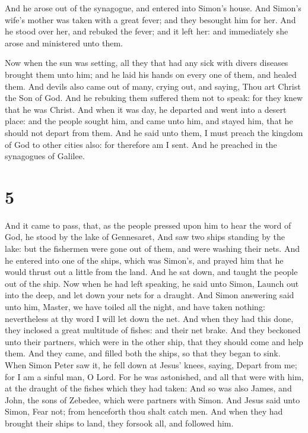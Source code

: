  And he arose out of the synagogue, and entered into
Simon's house. And Simon's wife's mother was taken with a great fever;
and they besought him for her.  And he stood over her, and
rebuked the fever; and it left her: and immediately she arose and
ministered unto them.

 Now when the sun was setting, all they that had any sick
with divers diseases brought them unto him; and he laid his hands on
every one of them, and healed them.  And devils also came
out of many, crying out, and saying, Thou art Christ the Son of God. And
he rebuking them suffered them not to speak: for they knew that he was
Christ.  And when it was day, he departed and went into a
desert place: and the people sought him, and came unto him, and stayed
him, that he should not depart from them.  And he said unto
them, I must preach the kingdom of God to other cities also: for
therefore am I sent.  And he preached in the synagogues of
Galilee.

\hypertarget{section-4}{%
\section{5}\label{section-4}}

 And it came to pass, that, as the people pressed upon him
to hear the word of God, he stood by the lake of Gennesaret,
 And saw two ships standing by the lake: but the fishermen
were gone out of them, and were washing their nets.  And he
entered into one of the ships, which was Simon's, and prayed him that he
would thrust out a little from the land. And he sat down, and taught the
people out of the ship.  Now when he had left speaking, he
said unto Simon, Launch out into the deep, and let down your nets for a
draught.  And Simon answering said unto him, Master, we have
toiled all the night, and have taken nothing: nevertheless at thy word I
will let down the net.  And when they had this done, they
inclosed a great multitude of fishes: and their net brake. 
And they beckoned unto their partners, which were in the other ship,
that they should come and help them. And they came, and filled both the
ships, so that they began to sink.  When Simon Peter saw it,
he fell down at Jesus' knees, saying, Depart from me; for I am a sinful
man, O Lord.  For he was astonished, and all that were with
him, at the draught of the fishes which they had taken: 
And so was also James, and John, the sons of Zebedee, which were
partners with Simon. And Jesus said unto Simon, Fear not; from
henceforth thou shalt catch men.  And when they had brought
their ships to land, they forsook all, and followed him.

